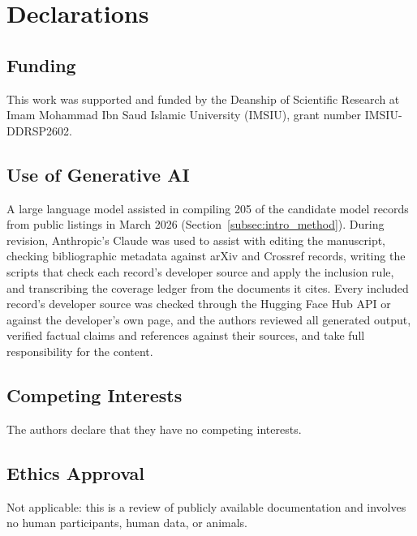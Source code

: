 \section*{Declarations}
\label{section:declarations}

\subsection*{Funding}
This work was supported and funded by the Deanship of Scientific Research at Imam Mohammad Ibn Saud Islamic University (IMSIU), grant number IMSIU-DDRSP2602.

\subsection*{Use of Generative AI}
A large language model assisted in compiling 205 of the candidate model records from public listings in March 2026 (Section~\ref{subsec:intro_method}). During revision, Anthropic's Claude was used to assist with editing the manuscript, checking bibliographic metadata against arXiv and Crossref records, writing the scripts that check each record's developer source and apply the inclusion rule, and transcribing the coverage ledger from the documents it cites. Every included record's developer source was checked through the Hugging Face Hub API or against the developer's own page, and the authors reviewed all generated output, verified factual claims and references against their sources, and take full responsibility for the content.

\subsection*{Competing Interests}
The authors declare that they have no competing interests.

\subsection*{Ethics Approval}
Not applicable: this is a review of publicly available documentation and involves no human participants, human data, or animals.

